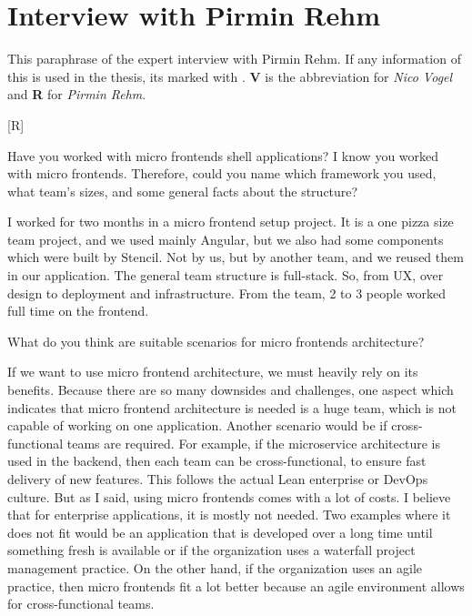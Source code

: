 
\section{Interview with Pirmin Rehm}

This paraphrase of the expert interview with Pirmin Rehm.
If any information of this is used in the thesis, its marked with \cite{Vogel.2020.Rehm}.
\textbf{V} is the abbreviation for \textit{Nico Vogel} and \textbf{R} for \textit{Pirmin Rehm}.

[R]

\begin{description}
    \NicoVogel Have you worked with micro frontends shell applications? I know you worked with micro frontends. Therefore, could you name which framework you used, what team's sizes, and some general facts about the structure?

    \PirminRehm I worked for two months in a micro frontend setup project. It is a one pizza size team project, and we used mainly Angular, but we also had some components which were built by Stencil. Not by us, but by another team, and we reused them in our application. The general team structure is full-stack. So, from UX, over design to deployment and infrastructure. From the team, 2 to 3 people worked full time on the frontend.

    \NicoVogel What do you think are suitable scenarios for micro frontends architecture?

    \PirminRehm If we want to use micro frontend architecture, we must heavily rely on its benefits. Because there are so many downsides and challenges, one aspect which indicates that micro frontend architecture is needed is a huge team, which is not capable of working on one application. Another scenario would be if cross-functional teams are required. For example, if the microservice architecture is used in the backend, then each team can be cross-functional, to ensure fast delivery of new features. This follows the actual Lean enterprise or DevOps culture.
    But as I said, using micro frontends comes with a lot of costs. I believe that for enterprise applications, it is mostly not needed. Two examples where it does not fit would be an application that is developed over a long time until something fresh is available or if the organization uses a waterfall project management practice.
    On the other hand, if the organization uses an agile practice, then micro frontends fit a lot better because an agile environment allows for cross-functional teams.





\end{description}
